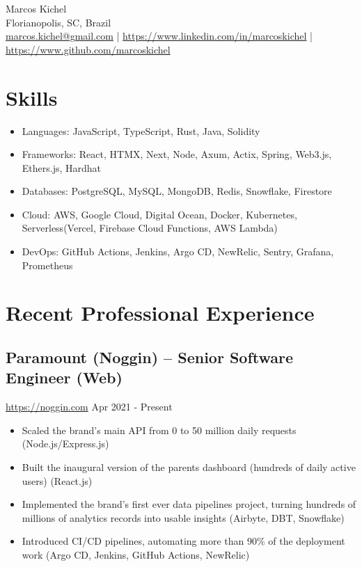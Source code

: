 \documentclass[11pt, a4paper]{article}
\begin{document}
\begin{center}
    {\Huge Marcos Kichel}\\
    \vspace{0.2cm}
    Florianopolis, SC, Brazil\\
    \href{mailto:marcos.kichel@gmail.com}{marcos.kichel@gmail.com} | \href{https://www.linkedin.com/in/marcoskichel/}{https://www.linkedin.com/in/marcoskichel} | \href{https://www.github.com/marcoskichel}{https://www.github.com/marcoskichel}
\end{center}

\section*{Skills}
\begin{itemize}[noitemsep]
    \item Languages: JavaScript, TypeScript, Rust, Java, Solidity
    \item Frameworks: React, HTMX, Next, Node, Axum, Actix, Spring, Web3.js, Ethers.js, Hardhat
    \item Databases: PostgreSQL, MySQL, MongoDB, Redis, Snowflake, Firestore
    \item Cloud: AWS, Google Cloud, Digital Ocean, Docker, Kubernetes, Serverless(Vercel, Firebase Cloud Functions, AWS Lambda)
    \item DevOps: GitHub Actions, Jenkins, Argo CD, NewRelic, Sentry, Grafana, Prometheus
\end{itemize}

\section*{Recent Professional Experience}
\subsection*{Paramount (Noggin) -- Senior Software Engineer (Web)}
\href{https://www.noggin.com}{https://noggin.com} \hfill Apr 2021 - Present
\begin{itemize}[noitemsep]
    \item Scaled the brand's main API from 0 to 50 million daily requests (Node.js/Express.js)
    \item Built the inaugural version of the parents dashboard (hundreds of daily active users) (React.js)
    \item Implemented the brand's first ever data pipelines project, turning hundreds of millions of analytics records into usable insights (Airbyte, DBT, Snowflake)
    \item Introduced CI/CD pipelines, automating more than 90\% of the deployment work (Argo CD, Jenkins, GitHub Actions, NewRelic)
\end{itemize}
\end{document}
